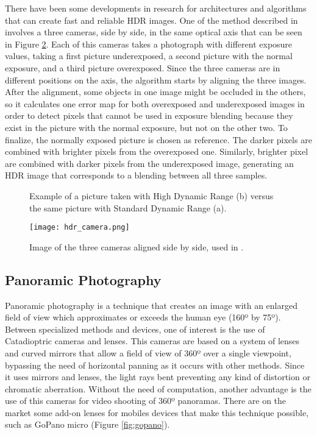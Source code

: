 There have been some developments in research for architectures and algorithms that can create fast and reliable HDR images.
One of the method described in \cite{Vavilin2011} involves a three cameras, side by side, in the same optical axis that can be seen in Figure \ref{fig:hdr_camera}. Each of this cameras takes a photograph with different exposure values, taking a first picture underexposed, a second picture with the normal exposure, and a third picture overexposed. 
Since the three cameras are in different positions on the axis, the algorithm starts by aligning the three images. After the alignment, some objects in one image might be occluded in the others, so it calculates one error map for both overexposed and underexposed images in order to detect pixels that cannot be used in exposure blending because they exist in the picture with the normal exposure, but not on the other two.
To finalize, the normally exposed picture is chosen as reference. The darker pixels are combined with brighter pixels from the overexposed one. Similarly, brighter pixel are combined with darker pixels from the underexposed image, generating an HDR image that corresponds to a blending between all three samples.
\begin{figure}[htbp]
        \centering
  \caption{Example of a picture taken with High Dynamic Range (b) versus the same picture with Standard Dynamic Range (a).}
  \label{fig:hdr_example}
\end{figure}

\begin{figure}[htbp]
	\centering
	\texttt{[image: hdr\_camera.png]}
	\caption{Image of the three cameras aligned side by side, used in \cite{Vavilin2011}.}
	\label{fig:hdr_camera}
\end{figure}

\subsection{Panoramic Photography}

Panoramic photography is a technique that creates an image with an enlarged field of view which approximates or exceeds the human eye (160º by 75º). Between specialized methods and devices, one of interest is the use of Catadioptric cameras and lenses. This cameras are based on a system of lenses and curved mirrors that allow a field of view of 360º over a single viewpoint, bypassing the need of horizontal panning as it occurs with other methods. Since it uses mirrors and lenses, the light rays bent preventing any kind of distortion or chromatic aberration. Without the need of computation, another advantage is the use of this cameras for video shooting of 360º panoramas. 
There are on the market some add-on lenses for mobiles devices that make this technique possible, such as GoPano micro (Figure \ref{fig:gopano}).

